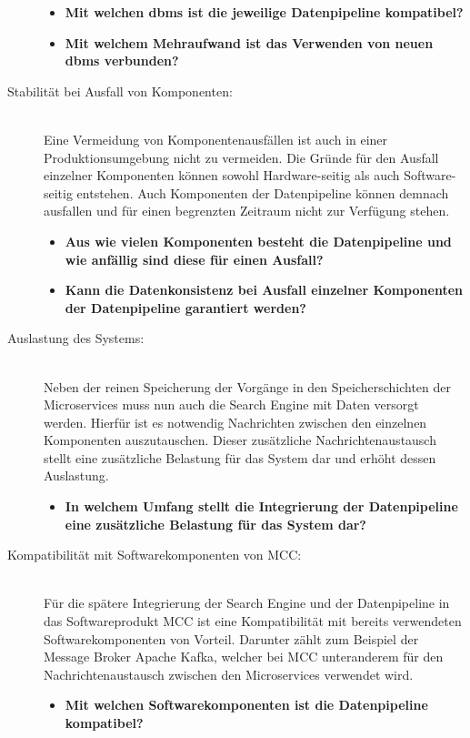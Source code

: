 \begin{description}
    \begin{itemize}
        \item \textbf{Mit welchen \gls{dbms} ist die jeweilige Datenpipeline kompatibel?}
        \item \textbf{Mit welchem Mehraufwand ist das Verwenden von \glqq neuen\grqq{} \gls{dbms} verbunden?}
    \end{itemize}
    
    \item[Stabilität bei Ausfall von Komponenten:]\hfill \\
    Eine Vermeidung von Komponentenausfällen ist auch in einer Produktionsumgebung nicht zu vermeiden. Die Gründe für den Ausfall einzelner Komponenten können sowohl Hardware-seitig als auch Software-seitig entstehen. Auch Komponenten der Datenpipeline können demnach ausfallen und für einen begrenzten Zeitraum nicht zur Verfügung stehen.

    \begin{itemize}
        \item \textbf{Aus wie vielen Komponenten besteht die Datenpipeline und wie anfällig sind diese für einen Ausfall?}
        \item \textbf{Kann die Datenkonsistenz bei Ausfall einzelner Komponenten der Datenpipeline garantiert werden?}
    \end{itemize}
    
    \item[Auslastung des Systems:]\hfill \\
    Neben der reinen Speicherung der Vorgänge in den Speicherschichten der Microservices muss nun auch die Search Engine mit Daten versorgt werden. Hierfür ist es notwendig Nachrichten zwischen den einzelnen Komponenten auszutauschen. Dieser zusätzliche Nachrichtenaustausch stellt eine zusätzliche Belastung für das System dar und erhöht dessen Auslastung.

    \begin{itemize}
        \item \textbf{In welchem Umfang stellt die Integrierung der Datenpipeline eine zusätzliche Belastung für das System dar?}
    \end{itemize}

    \item[Kompatibilität mit Softwarekomponenten von MCC:]\hfill \\
    Für die spätere Integrierung der Search Engine und der Datenpipeline in das Softwareprodukt MCC ist eine Kompatibilität mit bereits verwendeten Softwarekomponenten von Vorteil. Darunter zählt zum Beispiel der Message Broker \glqq Apache Kafka\grqq{}, welcher bei MCC unteranderem für den Nachrichtenaustausch zwischen den Microservices verwendet wird.

    \begin{itemize}
        \item \textbf{Mit welchen Softwarekomponenten ist die Datenpipeline kompatibel?}
    \end{itemize}

\end{description}

